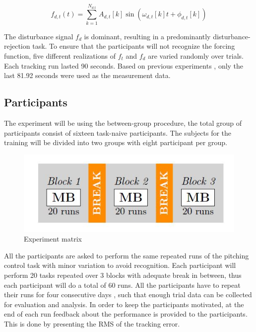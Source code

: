 \documentclass[conference]{IEEEtran}
\begin{document}
\begin{equation}
\label{eq:forcingfunctions}
f_{d, t}(t)=\sum_{k=1}^{N_{d . t}} A_{d, t}[k] \sin \left(\omega_{d, t}[k] t+\phi_{d, t}[k]\right)
\end{equation}

The disturbance signal $f_d$ is dominant, resulting in a predominantly disturbance-rejection task. To ensure that the participants will not recognize the forcing function, five different realizations of $f_t$ and $f_d$ are varied randomly over trials. Each tracking run lasted 90 seconds. Based on previous experiments \cite{pool2016effects}, only the last 81.92 seconds were used as the measurement data. \\

\subsection{Participants}

The experiment will be using the between-group procedure, the total group of participants consist of sixteen task-naive participants. The subjects for the training will be divided into two groups with eight participant per group. \\

\begin{figure}[h]
    \centering
    \includegraphics[width = \linewidth]{images/matrix.JPG}
    \caption{Experiment matrix}
    \label{fig:experiment matrix}
\end{figure}

All the participants are asked to perform the same repeated runs of the pitching control task with minor variation to avoid recognition. Each participant will perform 20 tasks repeated over 3 blocks with adequate break in between, thus each participant will do a total of 60 runs. All the participants have to repeat their runs for four consecutive days , such that enough trial data can be collected for evaluation and analysis. In order to keep the participants motivated, at the end of each run feedback about the performance is provided to the participants. This is done by presenting the RMS of the tracking error.\\
\end{document}
